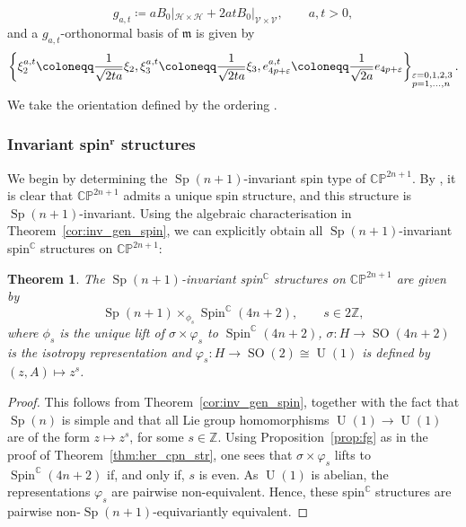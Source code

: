 \documentclass[pdftex]{sigma}
\numberwithin{equation}{section}
\newtheorem{Theorem}{Theorem}[section]
\newcommand{\Z}{\mathbb{Z}} %
\newcommand{\C}{\mathbb{C}} %
\newcommand{\restr}[1]{|_{#1}}
\DeclareMathOperator{\SO}{SO}
\DeclareMathOperator{\Spin}{Spin}
\DeclareMathOperator{\Sp}{Sp}
\DeclareMathOperator{\U}{U}
\begin{document}
		\begin{equation*}
			g_{a,t} \coloneqq a B_0\restr{\mathcal{H} \times \mathcal{H}} + 2at B_0\restr{\mathcal{V} \times \mathcal{V}} , \qquad a,t>0 ,
		\end{equation*}
		and a $g_{a,t}$-orthonormal basis of $\mathfrak{m}$ is given by
		\[
		\left\{ \xi_2^{a,t} \coloneqq \frac{1}{\sqrt{2ta}} \xi_2 , \xi_3^{a,t} \coloneqq \frac{1}{\sqrt{2ta}} \xi_3 , e_{4p + \varepsilon}^{a,t} \coloneqq \frac{1}{\sqrt{2a}} e_{4p + \varepsilon} \right\}_{\begin{subarray}{l} \varepsilon = 0,1,2,3 \\ p = 1 , \dots, n \end{subarray}} .
		\]
		We take the orientation defined by the ordering .
		
		
		\subsubsection[Invariant spin\^{}r structures]{Invariant spin$^{\boldsymbol{r}}$ structures}\label{inv_spinr_str_SpnU1}
		
		We begin by determining the $\Sp(n+1)$-invariant spin type of $\mathbb{CP}^{2n+1}$. By \cite[p.\ 327]{HS90}, it is clear that $\mathbb{CP}^{2n+1}$ admits a unique spin structure, and this structure is $\Sp(n+1)$-invariant. Using the algebraic characterisation in Theorem~\ref{cor:inv_gen_spin}, we can explicitly obtain all $\Sp(n+1)$-invariant spin$^{\C}$ structures on $\mathbb{CP}^{2n+1}$:
		
		\begin{Theorem}\label{thm_inv_gen_spin_structures_SpnU1}
			The $\Sp(n+1)$-invariant spin$^{\mathbb{C}}$ structures on $\mathbb{CP}^{2n+1}$ are given by
			\begin{equation*}
				\Sp(n+1) \times_{\phi_s} \Spin^{\mathbb{C}}(4n+2) , \qquad s \in 2\Z ,
			\end{equation*}
			where $\phi_s$ is the unique lift of $\sigma \times \varphi_s$ to $\Spin^{\mathbb{C}}(4n+2)$, $\sigma \colon H \to \SO(4n+2)$ is the isotropy representation and $\varphi_s \colon H \to \SO(2) \cong \U(1)$ is defined by $(z,A) \mapsto z^s$.
		\end{Theorem}
		
		\begin{proof}
			This follows from Theorem~\ref{cor:inv_gen_spin}, together with the fact that $\Sp(n)$ is simple and that all Lie group homomorphisms $\U(1) \to \U(1)$ are of the form $z \mapsto z^s$, for some $s \in \mathbb{Z}$. Using Proposition~\ref{prop:fg} as in the proof of Theorem~\ref{thm:her_cpn_str}, one sees that $\sigma \times \varphi_s$ lifts to $\Spin^{\mathbb{C}}(4n+2)$ if, and only if, $s$ is even. As $\U(1)$ is abelian, the representations $\varphi_s$ are pairwise non-equivalent. Hence, these spin$^{\mathbb{C}}$ structures are pairwise non-$\Sp(n+1)$-equivariantly equivalent.
		\end{proof}
		
\end{document}
